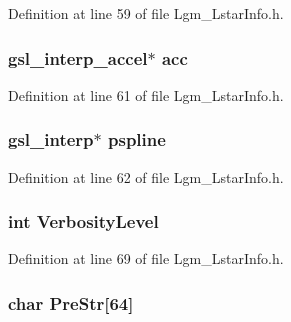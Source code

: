 Definition at line 59 of file Lgm\_\-LstarInfo.h.\hypertarget{struct_lgm___lstar_info_7c9a9e6523a7a6e67a5b349e772e3765}{
\subsubsection[{acc}]{\setlength{\rightskip}{0pt plus 5cm}gsl\_\-interp\_\-accel$\ast$ {\bf acc}}}
\label{struct_lgm___lstar_info_7c9a9e6523a7a6e67a5b349e772e3765}




Definition at line 61 of file Lgm\_\-LstarInfo.h.\hypertarget{struct_lgm___lstar_info_e44485025e16910b09a8c4e37b519bb1}{
\subsubsection[{pspline}]{\setlength{\rightskip}{0pt plus 5cm}gsl\_\-interp$\ast$ {\bf pspline}}}
\label{struct_lgm___lstar_info_e44485025e16910b09a8c4e37b519bb1}




Definition at line 62 of file Lgm\_\-LstarInfo.h.\hypertarget{struct_lgm___lstar_info_ef3011234df74566b679b46e01273bb7}{
\subsubsection[{VerbosityLevel}]{\setlength{\rightskip}{0pt plus 5cm}int {\bf VerbosityLevel}}}
\label{struct_lgm___lstar_info_ef3011234df74566b679b46e01273bb7}




Definition at line 69 of file Lgm\_\-LstarInfo.h.\hypertarget{struct_lgm___lstar_info_4f91fd49adec5f649e536a8d0c61f15f}{
\subsubsection[{PreStr}]{\setlength{\rightskip}{0pt plus 5cm}char {\bf PreStr}\mbox{[}64\mbox{]}}}
\label{struct_lgm___lstar_info_4f91fd49adec5f649e536a8d0c61f15f}




